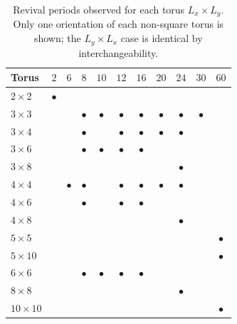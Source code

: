 \begin{table}[htbp]
\centering
\caption{Revival periods observed for each torus $L_x \times L_y$.
Only one orientation of each non-square torus is shown; the
$L_y \times L_x$ case is identical by interchangeability.}
\label{tab:torus-period}
\begin{tabular}{lcccccccccc}
\toprule
Torus & $2$ & $6$ & $8$ & $10$ & $12$ & $16$ & $20$ & $24$ & $30$ & $60$ \\
\midrule
$2\times2$  & $\bullet$ & & & & & & & & & \\
$3\times3$  & & & $\bullet$ & $\bullet$ & $\bullet$ & $\bullet$ & $\bullet$ & $\bullet$ & $\bullet$ & \\
$3\times4$  & & & $\bullet$ & & $\bullet$ & $\bullet$ & $\bullet$ & $\bullet$ & & \\
$3\times6$  & & & $\bullet$ & $\bullet$ & $\bullet$ & $\bullet$ & & & & \\
$3\times8$  & & & & & & & & $\bullet$ & & \\
$4\times4$  & & $\bullet$ & $\bullet$ & & $\bullet$ & $\bullet$ & $\bullet$ & $\bullet$ & & \\
$4\times6$  & & & $\bullet$ & & $\bullet$ & $\bullet$ & & & & \\
$4\times8$  & & & & & & & & $\bullet$ & & \\
$5\times5$  & & & & & & & & & & $\bullet$ \\
$5\times10$ & & & & & & & & & & $\bullet$ \\
$6\times6$  & & & $\bullet$ & $\bullet$ & $\bullet$ & $\bullet$ & & & & \\
$8\times8$  & & & & & & & & $\bullet$ & & \\
$10\times10$& & & & & & & & & & $\bullet$ \\
\bottomrule
\end{tabular}
\end{table}
